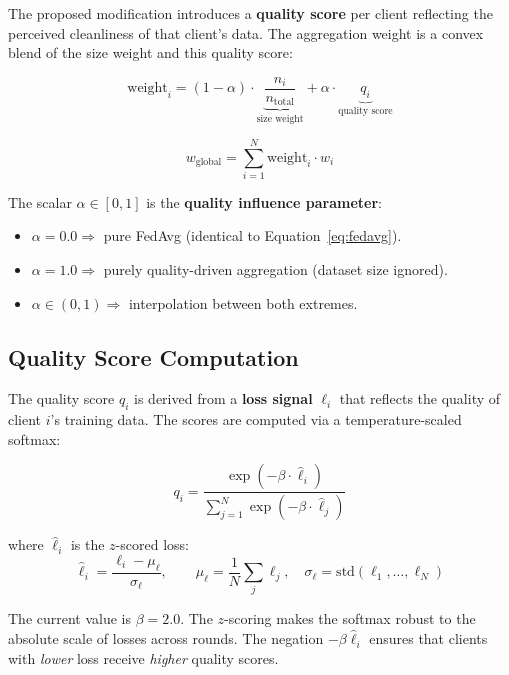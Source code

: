\documentclass[12pt,a4paper]{article}
\begin{document}
The proposed modification introduces a \textbf{quality score} per client reflecting the perceived cleanliness of that client's data. The aggregation weight is a convex blend of the size weight and this quality score:

\begin{equation}
  \text{weight}_i = (1 - \alpha) \cdot \underbrace{\frac{n_i}{n_{\text{total}}}}_{\text{size weight}} + \alpha \cdot \underbrace{q_i}_{\text{quality score}}
  \label{eq:qa_fedavg_weight}
\end{equation}

\begin{equation}
  w_{\text{global}} = \sum_{i=1}^{N} \text{weight}_i \cdot w_i
  \label{eq:qa_fedavg}
\end{equation}

The scalar $\alpha \in [0, 1]$ is the \textbf{quality influence parameter}:
\begin{itemize}
  \item $\alpha = 0.0 \Rightarrow$ pure FedAvg (identical to Equation~\ref{eq:fedavg}).
  \item $\alpha = 1.0 \Rightarrow$ purely quality-driven aggregation (dataset size ignored).
  \item $\alpha \in (0,1) \Rightarrow$ interpolation between both extremes.
\end{itemize}

\subsection{Quality Score Computation}

The quality score $q_i$ is derived from a \textbf{loss signal} $\ell_i$ that reflects the quality of client $i$'s training data. The scores are computed via a temperature-scaled softmax:

\begin{equation}
  q_i = \frac{\exp(-\beta \cdot \hat{\ell}_i)}{\sum_{j=1}^{N} \exp(-\beta \cdot \hat{\ell}_j)}
  \label{eq:quality_score}
\end{equation}

where $\hat{\ell}_i$ is the $z$-scored loss:
\begin{equation}
  \hat{\ell}_i = \frac{\ell_i - \mu_\ell}{\sigma_\ell}, \qquad \mu_\ell = \frac{1}{N}\sum_j \ell_j, \quad \sigma_\ell = \text{std}(\ell_1,\ldots,\ell_N)
  \label{eq:zscore}
\end{equation}

The current value is $\beta = 2.0$. The $z$-scoring makes the softmax robust to the absolute scale of losses across rounds. The negation $-\beta\hat{\ell}_i$ ensures that clients with \textit{lower} loss receive \textit{higher} quality scores.
\end{document}
